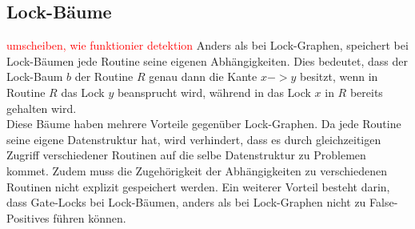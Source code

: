 \subsection{Lock-Bäume} \label{Kap::Theo:LockTree}
\textcolor{red}{umscheiben, wie funktionier detektion}
Anders als bei Lock-Graphen, speichert bei Lock-Bäumen jede Routine  
seine eigenen Abhängigkeiten. Dies bedeutet, dass der Lock-Baum $b$ der 
Routine $R$ genau dann die Kante $x->y$ besitzt, wenn in Routine $R$ das 
Lock $y$ beansprucht wird, während in das Lock $x$ in $R$ bereits gehalten wird.\\
Diese Bäume haben mehrere Vorteile gegenüber Lock-Graphen. Da jede Routine seine 
eigene Datenstruktur hat, wird verhindert, dass es durch 
gleichzeitigen Zugriff verschiedener Routinen auf die selbe Datenstruktur zu 
Problemen kommet. Zudem muss die Zugehörigkeit der Abhängigkeiten zu 
verschiedenen Routinen nicht explizit gespeichert werden. Ein weiterer Vorteil 
besteht darin, dass Gate-Locks bei Lock-Bäumen, anders als bei Lock-Graphen
nicht zu False-Positives führen können. 


